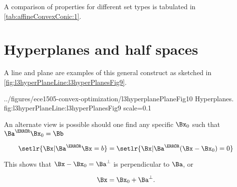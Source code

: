 A comparison of properties for different set types is tabulated in \cref{tab:affineConvexConic:1}.


\section{Hyperplanes and half spaces}


A line and plane are examples of this general construct as sketched in
\cref{fig:l3hyperPlaneLine:l3hyperPlanesFig9}.

{../figures/ece1505-convex-optimization/l3hyperplanePlaneFig10}
{Hyperplanes.}
{fig:l3hyperPlaneLine:l3hyperPlanesFig9}
{scale=0.1}

An alternate view is possible should one
find any specific \( \Bx_0 \) such that \( \Ba^\T \Bx_0 = \Bb \)

\begin{dmath}\label{eqn:convexOptimizationLecture3:740}
\setlr{\Bx | \Ba^\T \Bx = b }
=
\setlr{\Bx | \Ba^\T (\Bx -\Bx_0) = 0 }
\end{dmath}

This shows that \( \Bx - \Bx_0 = \Ba^\perp \) is perpendicular to \( \Ba \), or

\begin{dmath}\label{eqn:convexOptimizationLecture3:780}
\Bx
=
\Bx_0 + \Ba^\perp.
\end{dmath}

